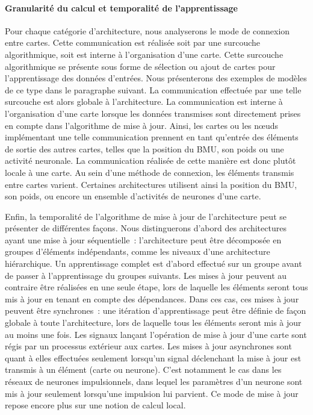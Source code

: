 \documentclass[../main]{subfiles}
\begin{document}
\paragraph{Granularité du calcul et temporalité de l'apprentissage}

Pour chaque catégorie d'architecture, nous analyserons le mode de connexion entre cartes. Cette communication est réalisée soit par une surcouche algorithmique, soit est interne à l'organisation d'une carte.
Cette surcouche algorithmique se présente sous forme de sélection ou ajout de cartes pour l'apprentissage des données d'entrées. 
Nous présenterons des exemples de modèles de ce type dans le paragraphe suivant. La communication effectuée par une telle surcouche est alors globale à l'architecture.
La communication est interne à l'organisation d'une carte lorsque les données transmises sont directement prises en compte dans l'algorithme de mise à jour. Ainsi, les cartes ou les n\oe{}uds implémentant une telle communication prennent en tant qu'entrée des éléments de sortie des autres cartes, telles que la position du BMU, son poids ou une activité neuronale. La communication réalisée de cette manière est donc plutôt locale à une carte.
Au sein d'une méthode de connexion, les éléments transmis entre cartes varient. Certaines architectures utilisent ainsi la position du BMU, son poids, ou encore un ensemble d'activités de neurones d'une carte.


Enfin, la temporalité de l'algorithme de mise à jour de l'architecture peut se présenter de différentes façons. Nous distinguerons d'abord des architectures ayant une mise à jour séquentielle~: l'architecture peut être décomposée en groupes d'éléments indépendants, comme les niveaux d'une architecture hiérarchique. 
Un apprentissage complet est d'abord effectué sur un groupe avant de passer à l'apprentissage du groupes suivants. 
Les mises à jour peuvent au contraire être réalisées en une seule étape, lors de laquelle les éléments seront tous mis à jour en tenant en compte des dépendances. Dans ces cas, ces mises à jour peuvent être synchrones~: une itération d'apprentissage peut être définie de façon globale à toute l'architecture, lors de laquelle tous les éléments seront mis à jour au moins une fois. Les signaux lançant l'opération de mise à jour d'une carte sont régis par un processus extérieur aux cartes.
Les mises à jour asynchrones sont quant à elles effectuées seulement lorsqu'un signal déclenchant la mise à jour est transmis à un élément (carte ou neurone). C'est notamment le cas dans les réseaux de neurones impulsionnels, dans lequel les paramètres d'un neurone sont mis à jour seulement lorsqu'une impulsion lui parvient. Ce mode de mise à jour repose encore plus sur une notion de calcul local.
\end{document}
